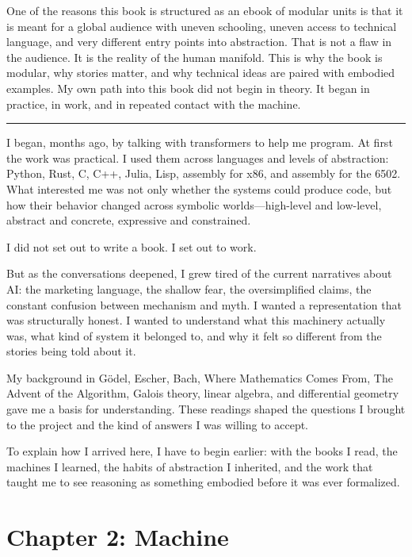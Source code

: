 One of the reasons this book is structured as an ebook of modular units
is that it is meant for a global audience with uneven schooling, uneven
access to technical language, and very different entry points into
abstraction. That is not a flaw in the audience. It is the reality of
the human manifold. This is why the book is modular, why stories matter,
and why technical ideas are paired with embodied examples. My own path
into this book did not begin in theory. It began in practice, in work,
and in repeated contact with the machine.

\begin{center}\rule{0.5\linewidth}{0.5pt}\end{center}

I began, months ago, by talking with transformers to help me program. At
first the work was practical. I used them across languages and levels of
abstraction: Python, Rust, C, C++, Julia, Lisp, assembly for x86, and
assembly for the 6502. What interested me was not only whether the
systems could produce code, but how their behavior changed across
symbolic worlds---high-level and low-level, abstract and concrete,
expressive and constrained.

I did not set out to write a book. I set out to work.

But as the conversations deepened, I grew tired of the current
narratives about AI: the marketing language, the shallow fear, the
oversimplified claims, the constant confusion between mechanism and
myth. I wanted a representation that was structurally honest. I wanted
to understand what this machinery actually was, what kind of system it
belonged to, and why it felt so different from the stories being told
about it.

My background in Gödel, Escher, Bach, Where Mathematics Comes From, The
Advent of the Algorithm, Galois theory, linear algebra, and differential
geometry gave me a basis for understanding. These readings shaped the
questions I brought to the project and the kind of answers I was willing
to accept.

To explain how I arrived here, I have to begin earlier: with the books I
read, the machines I learned, the habits of abstraction I inherited, and
the work that taught me to see reasoning as something embodied before it
was ever formalized.

\hypertarget{chapter-2-machine}{%
\section{Chapter 2: Machine}\label{chapter-2-machine}}


